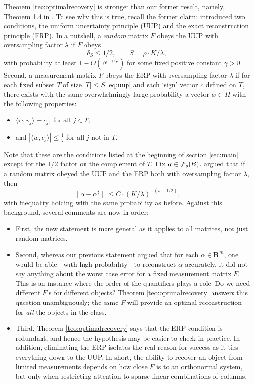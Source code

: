 \documentclass[11pt]{article}
\def\R{{{\mathbf{R}}}} %
\newcommand{\<}{\langle}
\renewcommand{\>}{\rangle}
\numberwithin{equation}{section}
\def\cF{{\cal F}}
\begin{document}
Theorem \ref{teo:optimalrecovery} is stronger than our former result,
namely, Theorem 1.4 in \cite{OptimalRecovery}. To see why this is
true, recall the former claim: \cite{OptimalRecovery} introduced two
conditions, the uniform uncertainty principle (UUP) and the exact
reconstruction principle (ERP).  In a nutshell, a {\em random} matrix
$F$ obeys the UUP with oversampling factor $\lambda$ if $F$ obeys
\begin{equation}
  \label{eq:uup}
   \delta_S \le 1/2, \qquad S = \rho \cdot K/\lambda, 
\end{equation}
with probability at least $1 - O(N^{-\gamma/\rho})$ for some fixed
positive constant $\gamma > 0$. Second, a measurement matrix $F$ obeys
the ERP with oversampling factor $\lambda$ if for each fixed subset
$T$ of size $|T| \le S$ \eqref{eq:uup} and each `sign' vector $c$
defined on $T$, there exists with the same overwhelmingly large
probability a vector $w \in H$ with the following properties:
\begin{itemize}
\item[(i)] $\<w, v_j\> = c_j$, for all $j \in T$;
\item[(ii)] and $|\<w, v_j\>| \leq \frac{1}{2}$ 
for all $j$ not  in $T$. 
\end{itemize}
Note that these are the conditions listed at the beginning of section
\ref{sec:main} except for the 1/2 factor on the complement of $T$. Fix
$\alpha \in \cF_s(B)$.  \cite{OptimalRecovery} argued that if a
random matrix obeyed the UUP and the ERP both with oversampling factor
$\lambda$, then 
\[
\|\alpha - \alpha^\sharp\| \le C \cdot (K/\lambda)^{-(s-1/2)},
\]
with inequality holding with the same probability as before.  Against
this background, several comments are now in order:
\begin{itemize}
\item First, the new statement is more general as it applies to all
  matrices, not just random matrices. 
  
\item Second, whereas our previous statement argued that for each
  $\alpha \in \R^m$, one would be able---with high probability---to
  reconstruct $\alpha$ accurately, it did not say anything about the
  worst case error for a fixed measurement matrix $F$. This is an
  instance where the order of the quantifiers plays a role. Do we need
  different $F$'s for different objects? Theorem
  \ref{teo:optimalrecovery} answers this question unambiguously; the
  same $F$ will provide an optimal reconstruction for {\em all} the
  objects in the class.
  
\item Third, Theorem \ref{teo:optimalrecovery} says that the ERP
  condition is redundant, and hence the hypothesis may be easier to
  check in practice.  In addition, eliminating the ERP isolates the
  real reason for success as it ties everything down to the UUP. In
  short, the ability to recover an object from limited measurements
  depends on how close $F$ is to an orthonormal system, but only when
  restricting attention to sparse linear combinations of columns.
\end{itemize}
\end{document}
